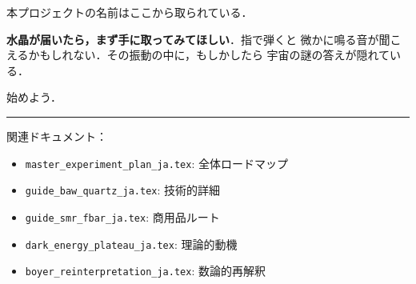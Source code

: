 \documentclass[11pt,a4paper]{article}
\begin{document}
本プロジェクトの名前はここから取られている．

\textbf{水晶が届いたら，まず手に取ってみてほしい}．指で弾くと
微かに鳴る音が聞こえるかもしれない．その振動の中に，もしかしたら
宇宙の謎の答えが隠れている．

始めよう．

\vspace{2em}
\hrule
\vspace{0.5em}
\small
\noindent
関連ドキュメント：
\begin{itemize}
\item \texttt{master\_experiment\_plan\_ja.tex}: 全体ロードマップ
\item \texttt{guide\_baw\_quartz\_ja.tex}: 技術的詳細
\item \texttt{guide\_smr\_fbar\_ja.tex}: 商用品ルート
\item \texttt{dark\_energy\_plateau\_ja.tex}: 理論的動機
\item \texttt{boyer\_reinterpretation\_ja.tex}: 数論的再解釈
\end{itemize}
\end{document}
